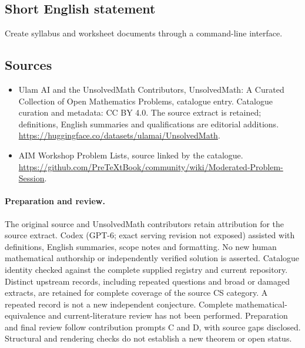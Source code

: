 \documentclass[11pt]{article}
\begin{document}
\subsection{Short English statement}
Create syllabus and worksheet documents through a command-line interface.
\subsection{Sources}
\begin{itemize}
\item[\hypertarget{source:statement:1}{S1}] Ulam AI and the UnsolvedMath Contributors, UnsolvedMath: A Curated Collection of Open Mathematics Problems, catalogue entry. Catalogue curation and metadata: CC BY 4.0. The source extract is retained; definitions, English summaries and qualifications are editorial additions.
\url{https://huggingface.co/datasets/ulamai/UnsolvedMath}.
\item[\hypertarget{source:statement:2}{S2}] AIM Workshop Problem Lists, source linked by the catalogue.
\url{https://github.com/PreTeXtBook/community/wiki/Moderated-Problem-Session}.
\end{itemize}
\paragraph{Preparation and review.}
The original source and UnsolvedMath contributors retain attribution for the source extract. Codex (GPT-6; exact serving revision not exposed) assisted with definitions, English summaries, scope notes and formatting. No new human mathematical authorship or independently verified solution is asserted. Catalogue identity checked against the complete supplied registry and current repository. Distinct upstream records, including repeated questions and broad or damaged extracts, are retained for complete coverage of the source CS category. A repeated record is not a new independent conjecture. Complete mathematical-equivalence and current-literature review has not been performed. Preparation and final review follow contribution prompts C and D, with source gaps disclosed. Structural and rendering checks do not establish a new theorem or open status.
\label{end:statement}
\end{document}
